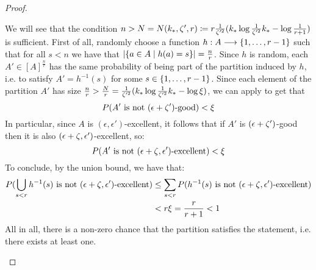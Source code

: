 \begin{lemma}[Claim 5.13]
\begin{proof}
\begin{enumerate}[label=(\alph*), ref=\alph*]
                    We will see that the condition
                    $n > N = N( k_{*}, \zeta', r ) \coloneqq r \frac{1}{\zeta'^2}( k_* \log{\frac{1}{\zeta'^2}k_*} - \log{\frac{1}{r + 1}} )$
                    is sufficient.
                    First of all, randomly choose a function $h: A \longrightarrow \{ 1, \dots, r-1 \}$ such that
                    for all $s < n$ we have that $| \{ a \in A \mid h(a) = s \} | = \frac{n}{r}$.
                    Since $h$ is random, each $A' \in [A]^\frac{n}{r}$ has the same probability of being part of the partition
                    induced by $h$, i.e. to satisfy $A' = h^{-1}(s)$ for some $s \in \{ 1, \dots, r-1 \}$.
                    Since each element of the partition $A'$ has size
                    $\frac{n}{r} > \frac{N}{r} = \frac{1}{\zeta'^2}( k_* \log{\frac{1}{\zeta'^2}k_*} - \log{\xi} )$,
                    we can apply  to get that
                    \[
                        P( A' \text{ is not } ( \epsilon + \zeta' )\text{-good} ) < \xi
                    \]
                    In particular, since $A$ is $(\epsilon, \epsilon')$-excellent, it follows  that if $A'$ is
                    $( \epsilon + \zeta' )$-good then it is also $( \epsilon + \zeta, \epsilon' )$-excellent, so:
                    \[
                        P( A' \text{ is not } ( \epsilon + \zeta, \epsilon' )\text{-excellent} ) < \xi
                    \]
                    To conclude, by the union bound, we have that:
                    \begin{align*}
                        P( \bigcup_{s < r} h^{-1}(s) \text{ is not } ( \epsilon + \zeta, \epsilon' )\text{-excellent} )
                            & \leq \sum_{s < r} P( h^{-1}(s) \text{ is not } ( \epsilon + \zeta, \epsilon' )\text{-excellent} ) \\
                            & < r \xi = \frac{r}{r+1} < 1
                    \end{align*}
                    All in all, there is a non-zero chance that the partition satisfies the statement, i.e. there exists at least one.
            \end{enumerate}
            \end{proof}
        \end{lemma}


